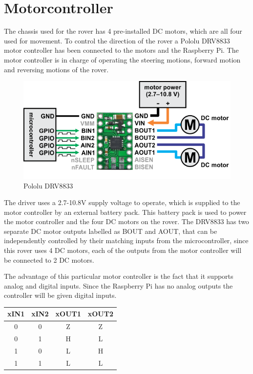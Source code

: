 \clearpage
\section{Motorcontroller}

The chassis used for the rover has 4 pre-installed DC motors, which are all four used for movement. To control the direction of the rover a Pololu DRV8833 motor controller has been connected to the motors and the Raspberry Pi. The motor controller is in charge of operating the steering motions, forward motion and reversing motions of the rover.

\begin{figure}[H]
	\centering
	\includegraphics[width=.8\linewidth]{images/DRV8833.png}
	\caption{Pololu DRV8833\cite{DRV8833pic}}
\end{figure}

The driver uses a 2.7-10.8V supply voltage to operate, which is supplied to the motor controller by an external battery pack. This battery pack is used to power the motor controller and the four DC motors on the rover. The DRV8833 has two separate DC motor outputs labelled as BOUT and AOUT, that can be independently controlled by their matching inputs from the microcontroller, since this rover uses 4 DC motors, each of the outputs from the motor controller will be connected to 2 DC motors.

The advantage of this particular motor controller is the fact that it supports analog and digital inputs. Since the Raspberry Pi has no analog outputs the controller will be given digital inputs. 

\begin{table}[H]
\centering
\begin{tabular}{|c|c|c|c|}
\hline
xIN1 & xIN2 & xOUT1 & xOUT2 \\ \hline
0    & 0    & Z     & Z     \\ \hline
0    & 1    & H     & L     \\ \hline
1    & 0    & L     & H     \\ \hline
1    & 1    & L     & L     \\ \hline
\end{tabular}
\end{table}

